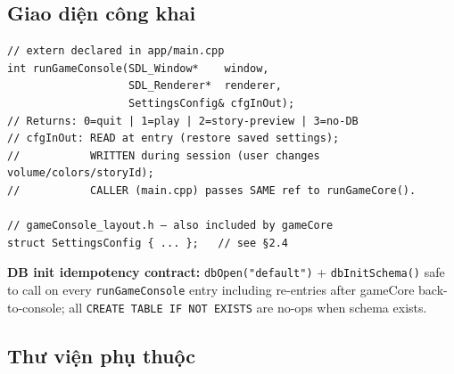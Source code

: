 \documentclass[12pt,a4paper]{article}
\begin{document}
\begin{center}
\end{center}

\subsection{Giao diện công khai}

\begin{verbatim}
// extern declared in app/main.cpp
int runGameConsole(SDL_Window*    window,
                   SDL_Renderer*  renderer,
                   SettingsConfig& cfgInOut);
// Returns: 0=quit | 1=play | 2=story-preview | 3=no-DB
// cfgInOut: READ at entry (restore saved settings);
//           WRITTEN during session (user changes volume/colors/storyId);
//           CALLER (main.cpp) passes SAME ref to runGameCore().

// gameConsole_layout.h — also included by gameCore
struct SettingsConfig { ... };   // see §2.4
\end{verbatim}

\noindent\textbf{DB init idempotency contract:}
\foreignlanguage{english}{\texttt{dbOpen("default")}} + \texttt{dbInitSchema()} safe to call on
every \texttt{runGameConsole} entry including re-entries after
gameCore back-to-console; all \texttt{CREATE TABLE IF NOT EXISTS}
are no-ops when schema exists.

\subsection{Thư viện phụ thuộc}
\end{document}
